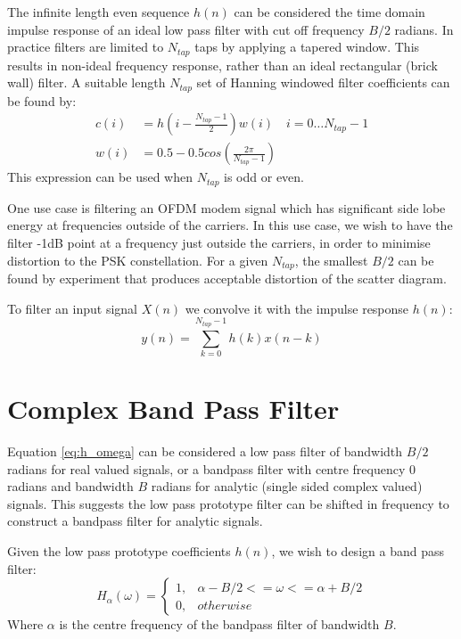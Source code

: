 \documentclass{article}
\begin{document}
The infinite length even sequence $h(n)$ can be considered the time domain impulse response of an ideal low pass filter with cut off frequency $B/2$ radians. In practice filters are limited to $N_{tap}$ taps by applying a tapered window.  This results in non-ideal frequency response, rather than an ideal rectangular (brick wall) filter. A suitable length $N_{tap}$ set of Hanning windowed filter coefficients can be found by:
\begin{equation}
\begin{split}
c(i) &= h \left( i-\frac{N_{tap}-1}{2} \right) w(i) \quad i=0 \ldots N_{tap}-1 \\
w(i) &= 0.5 - 0.5cos \left( \frac{2 \pi}{N_{tap}-1} \right)
\end{split}
\end{equation}
This expression can be used when $N_{tap}$ is odd or even.

One use case is filtering an OFDM modem signal which has significant side lobe energy at frequencies outside of the carriers. In this use case, we wish to have the filter -1dB point at a frequency just outside the carriers, in order to minimise distortion to the PSK constellation.  For a given $N_{tap}$, the smallest $B/2$ can be found by experiment that produces acceptable distortion of the scatter diagram.

To filter an input signal $X(n)$ we convolve it with the impulse response $h(n)$:
\begin{equation} \label{eq:filter_conv}
y(n) = \sum_{k=0}^{N_{tap}-1} h(k) x(n-k)
\end{equation}

\section{Complex Band Pass Filter}

Equation \ref{eq:h_omega} can be considered a low pass filter of bandwidth $B/2$ radians for real valued signals, or a bandpass filter with centre frequency 0 radians and bandwidth $B$ radians for analytic (single sided complex valued) signals. This suggests the low pass prototype filter can be shifted in frequency to construct a bandpass filter for analytic signals. 

Given the low pass prototype coefficients $h(n)$, we wish to design a band pass filter:
\begin{equation} \label{eq:h_omega_bp}
  H_{\alpha}(\omega)= 
	\begin{cases}
      1, & \alpha - B/2 <= \omega <= \alpha + B/2 \\
      0, & otherwise
	\end{cases}
\end{equation}
Where $\alpha$ is the centre frequency of the bandpass filter of bandwidth $B$.  
\end{document}

